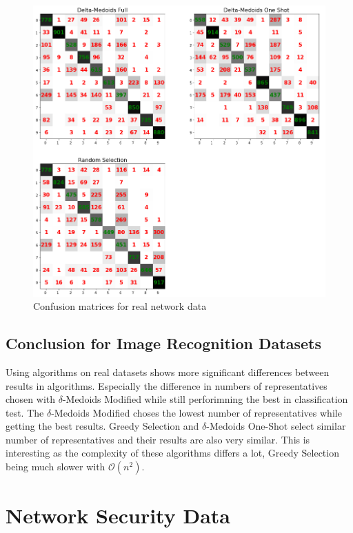 \documentclass[thesis=B,english]{FITthesis}[2012/10/20]
\begin{document}
\begin{figure}[t]
   \includegraphics[width=\linewidth]{img/exp3_mnist_fashion.png}
  \caption{Confusion matrices for real network data}
  \label{img:exp4}
\end{figure}

\subsection{Conclusion for Image Recognition Datasets}
Using algorithms on real datasets shows more significant differences between results in algorithms.
Especially the difference in numbers of representatives chosen with $\delta$-Medoids Modified while still perforimning the best in classification test.
The $\delta$-Medoids Modified choses the lowest number of representatives while getting the best results.
Greedy Selection and $\delta$-Medoids One-Shot select similar number of representatives and their results are also very similar.
This is interesting as the complexity of these algorithms differs a lot, Greedy Selection being much slower with $\mathcal{O}(n^2)$.

\section{Network Security Data}\label{sec:exp4}
\end{document}
